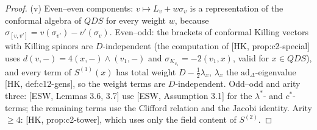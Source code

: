 \begin{proof}
(v) Even--even components: $v\mapsto L_v+w\sigma_v$ is a representation of the conformal algebra of $QDS$ for every weight $w$, because $\sigma_{[v,v']}=v(\sigma_{v'})-v'(\sigma_v)$. Even--odd: the brackets of conformal Killing vectors with Killing spinors are $D$-independent (the computation of [HK, prop:c2-special] uses $d(v,-)=4(x,-)\wedge(v_1,-)$ and $\sigma_{K_{v_1}}=-2(v_1,x)$, valid for $x\in QDS$), and every term of $S^{(1)}(x)$ has total weight $D-\frac12\lambda_x$, $\lambda_x$ the $\mathrm{ad}_\Delta$-eigenvalue [HK, def:c12-gens], so the weight terms are $D$-independent. Odd--odd and arity three: [ESW, Lemmas 3.6, 3.7] use [ESW, Assumption 3.1] for the $\lambda^*$- and $c^*$-terms; the remaining terms use the Clifford relation and the Jacobi identity. Arity $\ge4$: [HK, prop:c2-tower], which uses only the field content of $S^{(2)}$.
\end{proof}

